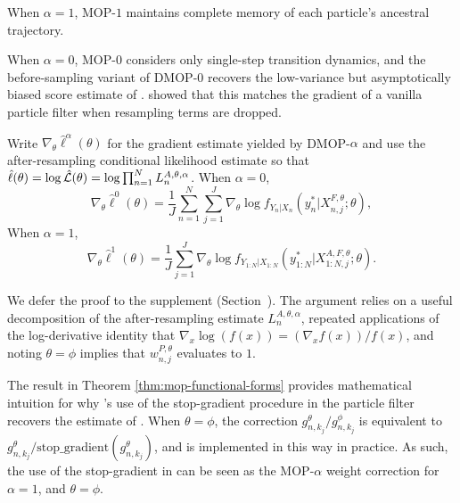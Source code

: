 \documentclass[numsec,webpdf,modern,medium,namedate]{oup-authoring-template}
\begin{document}
When $\alpha=1$, MOP-$1$ maintains complete memory of each particle's ancestral trajectory.
\newEdit{\editPoyiadjisCorrespondence}

When $\alpha=0$, MOP-$0$ considers only single-step transition dynamics, and the before-sampling variant of DMOP-$0$ recovers the low-variance but asymptotically biased score estimate of \cite{naesseth18}.
\cite{scibior21} showed that this matches the gradient of a vanilla particle filter when resampling terms are dropped. 

\begin{thm}
    \label{thm:mop-functional-forms}
    Write $\nabla_\theta \hat\ell^\alpha(\theta)$ for the gradient estimate yielded by DMOP-$\alpha$ 
    and use the after-resampling conditional likelihood estimate so that $\hat{\ell}(\theta)= \log \hat{\mathcal{L}}(\theta) = \log \prod_{n=1}^N L_n^{A, \theta, \alpha}$. When $\alpha=0$,
    \begin{equation} \nonumber %
        \nabla_\theta \hat\ell^0(\theta) 
        = \frac{1}{J} \sum_{n=1}^N \sum_{j=1}^J \nabla_\theta \log f_{Y_n|X_{n}}\left(y_n^*|X_{n,j}^{F, \theta}; \theta\right),
    \end{equation}
    \newEdit{\editTheoremOne}
    When $\alpha=1$,
    \begin{equation} \nonumber %
        \nabla_\theta \hat{\ell}^1(\theta) 
        = \frac{1}{J}\sum_{j=1}^J \nabla_\theta \log f_{Y_{1:N}|X_{1:N}}\left(y_{1:N}^* | X_{1:N,j}^{A,F,\theta}; \theta \right).
    \end{equation}
    \newEdit{\editAncestorDefinition}
\end{thm}

We defer the proof to the supplement (Section~\suppSecProofFunctionalForms). 
The argument relies on a useful decomposition of the after-resampling estimate $L_n^{A,\theta,\alpha}$, repeated applications of the log-derivative identity that $\nabla_x \log(f(x)) = (\nabla_x f(x))/f(x)$, and noting $\theta=\phi$ implies that $w_{n,j}^{P,\theta}$ evaluates to $1$. 

The result in Theorem \ref{thm:mop-functional-forms} provides mathematical intuition for why \cite{scibior21}'s use of the stop-gradient procedure in the particle filter recovers the estimate of \cite{poyiadjis11}.
When $\theta=\phi$, the correction $g_{n,k_j}^\theta/g_{n,k_j}^\phi$ is equivalent to $g_{n,k_j}^\theta / \text{stop\_gradient}(g_{n,k_j}^\theta)$, and is implemented in this way in practice.
As such, the use of the stop-gradient in \cite{scibior21} can be seen as the MOP-$\alpha$ weight correction for $\alpha=1$, and $\theta=\phi$.
\end{document}
